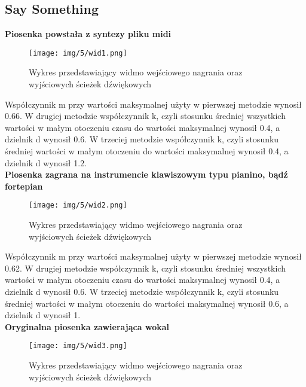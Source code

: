 \newpage
\subsection{Say Something}

\textbf{Piosenka powstała z syntezy pliku midi}

\begin{figure}[h]
  \centering
  \texttt{[image: img/5/wid1.png]}
  \caption{Wykres przedstawiający widmo wejściowego nagrania oraz \\wyjściowych ścieżek dźwiękowych}
\end{figure}

\noindent Współczynnik m przy wartości maksymalnej użyty w pierwszej metodzie wynosił 0.66.
W drugiej metodzie współczynnik k, czyli stosunku średniej wszystkich wartości w małym otoczeniu czasu do wartości maksymalnej wynosił 0.4, a dzielnik d wynosił 0.6.
W trzeciej metodzie współczynnik k, czyli stosunku średniej wartości w małym otoczeniu do wartości maksymalnej wynosił 0.4, a dzielnik d wynosił 1.2.\\

\textbf{Piosenka zagrana na instrumencie klawiszowym typu pianino, bądź fortepian}

\begin{figure}[h]
  \centering
  \texttt{[image: img/5/wid2.png]}
  \caption{Wykres przedstawiający widmo wejściowego nagrania oraz \\wyjściowych ścieżek dźwiękowych}
\end{figure}


\noindent Współczynnik m przy wartości maksymalnej użyty w pierwszej metodzie wynosił 0.62.
W drugiej metodzie współczynnik k, czyli stosunku średniej wszystkich wartości w małym otoczeniu czasu do wartości maksymalnej wynosił 0.4, a dzielnik d wynosił 0.6.
W trzeciej metodzie współczynnik k, czyli stosunku średniej wartości w małym otoczeniu do wartości maksymalnej wynosił 0.6, a dzielnik d wynosił 1.\\

\textbf{Oryginalna piosenka zawierająca wokal}

\begin{figure}[h]
  \centering
  \texttt{[image: img/5/wid3.png]}
  \caption{Wykres przedstawiający widmo wejściowego nagrania oraz \\wyjściowych ścieżek dźwiękowych}
\end{figure}

